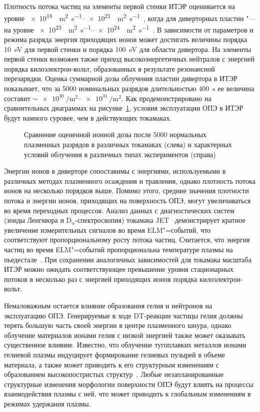 Плотность потока частиц на элементы первой стенки ИТЭР оценивается на уровне \SIrange{e18}{e21}{\per\metre\squared\per\second}~\cite{DeTemmerman2021, Rivals2022}, когда для диверторных пластин "--- на уровне \SIrange{e23}{e24}{\per\metre\squared\per\second}~\cite{Pitts2019,Orrico2023}. В зависимости от параметров и режима разряда энергия приходящих ионов может достигать величины порядка \SI{10}{\electronvolt} для первой стенки и порядка \SI{100}{\electronvolt} для области дивертора. На элементы первой стенки возможен также приход высокоэнергетичных нейтралов с энергией порядка килоэлектрон-вольт, образованных в результате резонансной перезарядки. Оценка суммарной дозы облучения пластин дивертора в ИТЭР показывает, что за 5000 номинальных разрядов длительностью \SI{400}{\second} ее величина составит \( \sim \SIrange{e30}{e31}{\per\metre\squared} \). Как продемонстрировано на сравнительных диаграммах на рисунке~\cref{fig:ch1/fluxes_comparison}, условия эксплуатации ОПЭ в ИТЭР будут намного суровее, чем в действующих токамаках.
\begin{figure}[ht]
    \caption{Сравнение оцененной ионной дозы после 5000 нормальных плазменных разрядов в различных токамаках (слева) и характерных условий облучения в различных типах экспериментов (справа)~\cite{DeTemmerman2018}}\label{fig:ch1/fluxes_comparison}
\end{figure}
Энергии ионов в диверторе сопоставимы с энергиями, используемыми в различных методах плазменного осаждения и травления, однако плотность потока ионов на несколько порядков выше. Помимо этого, средние значения плотности потока и энергии ионов, приходящих на поверхность ОПЭ, могут увеличиваться во время переходных процессов. Анализ данных с диагностических систем (зонды Ленгмюра и \(\mathrm{D}_\alpha\)-спектроскопия) токамака JET~\cite{Guillemaut2015,Guillemaut2018} демонстрирует кратное увеличение измерительных сигналов во время ELM"=событий, что соответствуют пропорциональному росту потока частиц. Считается, что энергия частиц во время ELM"=событий пропорциональна температуре плазмы на пьедестале~\cite{Eich2017}. При сохранении аналогичных зависимостей для токамака масштаба ИТЭР можно ожидать соответствующее превышение уровня стационарных потоков в несколько раз с энергией приходящих ионов порядка килоэлектрон-вольт.

Немаловажным остается влияние образования гелия и нейтронов на эксплуатацию ОПЭ. Генерируемые в ходе DT-реакции частицы гелия должны терять большую часть своей энергии в центре плазменного шнура, однако облучение материалов ионами гелия с низкой энергией также может оказывать существенное влияние. Известно, что облучение тугоплавких металлов ионами гелиевой плазмы индуцирует формирование гелиевых пузырей в объеме материала, а также может приводить к его структурным изменениям с образованием высокопостристых структур~\cite{Ueda2018,Kajita2018,Fedorovich2019}. Любые незапланированные структурные изменения морфологии поверхности ОПЭ будут влиять на процессы взаимодействия плазмы с ней, что может приводить к глобальным изменениям в режимах удержания плазмы.

